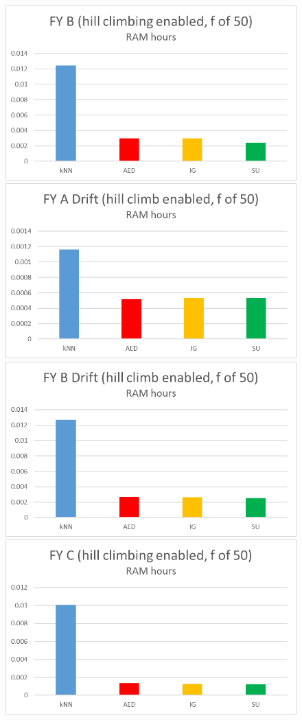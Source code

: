 \begin{figure}[hp]
\includegraphics[scale=0.17]{Graphs/FY_B/H_mem}
\includegraphics[scale=0.17]{Graphs/FY_A_Drift/H_mem}
\includegraphics[scale=0.17]{Graphs/FY_B_Drift/H_mem}
\includegraphics[scale=0.17]{Graphs/FY_C/H_mem}

\end{figure}
